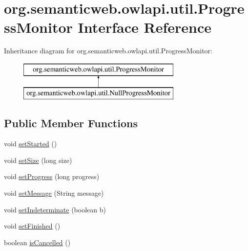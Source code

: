 \hypertarget{interfaceorg_1_1semanticweb_1_1owlapi_1_1util_1_1_progress_monitor}{\section{org.\-semanticweb.\-owlapi.\-util.\-Progress\-Monitor Interface Reference}
\label{interfaceorg_1_1semanticweb_1_1owlapi_1_1util_1_1_progress_monitor}
}
Inheritance diagram for org.\-semanticweb.\-owlapi.\-util.\-Progress\-Monitor\-:\begin{figure}[H]
\begin{center}
\leavevmode
\includegraphics[height=2.000000cm]{interfaceorg_1_1semanticweb_1_1owlapi_1_1util_1_1_progress_monitor}
\end{center}
\end{figure}
\subsection*{Public Member Functions}
\begin{DoxyCompactItemize}
\item 
void \hyperlink{interfaceorg_1_1semanticweb_1_1owlapi_1_1util_1_1_progress_monitor_aa653d6a98d82dd0575b7b558617f9ed3}{set\-Started} ()
\item 
void \hyperlink{interfaceorg_1_1semanticweb_1_1owlapi_1_1util_1_1_progress_monitor_ada771f1c40b9e1414e4379f037eb4539}{set\-Size} (long size)
\item 
void \hyperlink{interfaceorg_1_1semanticweb_1_1owlapi_1_1util_1_1_progress_monitor_a311b061918809588889da10c28d49f32}{set\-Progress} (long progress)
\item 
void \hyperlink{interfaceorg_1_1semanticweb_1_1owlapi_1_1util_1_1_progress_monitor_a6704230f171bf0b0348b17c934f87df8}{set\-Message} (String message)
\item 
void \hyperlink{interfaceorg_1_1semanticweb_1_1owlapi_1_1util_1_1_progress_monitor_a3b6b20f82608acf2e8e2dcd1ad11f867}{set\-Indeterminate} (boolean b)
\item 
void \hyperlink{interfaceorg_1_1semanticweb_1_1owlapi_1_1util_1_1_progress_monitor_aa83d83fb94e044e2bdb58e1bdc202ae8}{set\-Finished} ()
\item 
boolean \hyperlink{interfaceorg_1_1semanticweb_1_1owlapi_1_1util_1_1_progress_monitor_a6d810fdb86d2d0fefb1f0a84094fe6fe}{is\-Cancelled} ()
\end{DoxyCompactItemize}


